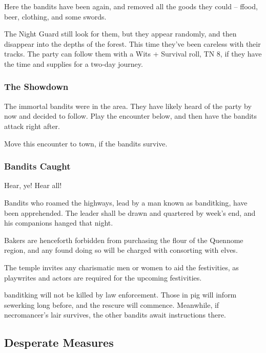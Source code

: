 Here the bandits have been again, and removed all the goods they could -- ffood, beer, clothing, and some swords.

The Night Guard still look for them, but they appear randomly, and then disappear into the depths of the forest.  This time they've been careless with their tracks.  The party can follow them with a Wits + Survival roll, TN 8, if they have the time and supplies for a two-day journey.

\subsubsection{The Showdown}
The immortal bandits were in the area.  They have likely heard of the party by now and decided to follow.  Play the encounter below, and then have the bandits attack right after.

\humansoldier

Move this encounter to town, if the bandits survive.

\subsubsection{Bandits Caught}


\begin{boxtext}
	Hear, ye!  Hear all!

	Bandits who roamed the highways, lead by a man known as \gls{banditking}, have been apprehended.  The leader shall be drawn and quartered by week's end, and his companions hanged that night.

	Bakers are henceforth forbidden from purchasing the flour of the Quennome region, and any found doing so will be charged with consorting with elves.

	The temple invites any charismatic men or women to aid the festivities, as playwrites and actors are required for the upcoming festivities.

\end{boxtext}

\Gls{banditking} will not be killed by law enforcement.  Those in \gls{pig} will inform \gls{sewerking} long before, and the rescure will commence.  Meanwhile, if \gls{necromancer}'s lair survives, the other bandits await instructions there.

\subsection[Desperate Measures]{Desperate Measures}\label{desperatemeasures}

